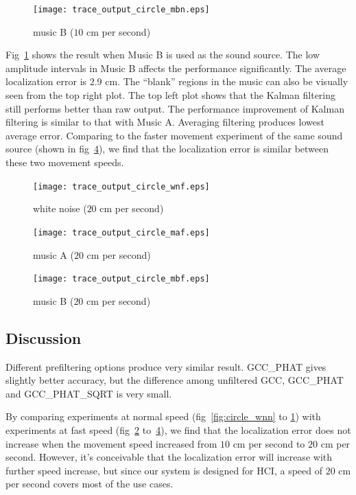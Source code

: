 \begin{figure}[h!]
\centering
\texttt{[image: trace\_output\_circle\_mbn.eps]}
\caption{music B ($10$ cm per second)}
\label{fig:circle_musicbn}
\end{figure}

Fig~\ref{fig:circle_musicbn} shows the result when Music B is used as the sound source.  The low amplitude intervals in Music B affects the performance significantly. The average localization error is $2.9$ cm. The ``blank'' regions in the music can also be visually seen from the top right plot. The top left plot shows that the Kalman filtering still performs better than raw output. The performance improvement of Kalman filtering is similar to that with Music A. Averaging filtering produces lowest average error. Comparing to the faster movement experiment of the same sound source (shown in fig~\ref{fig:circle_musicbf}), we find that the localization error is similar between these two movement speeds.

\begin{figure}[h!]
\centering
\texttt{[image: trace\_output\_circle\_wnf.eps]}
\caption{white noise ($20$ cm per second)}
\label{fig:circle_wnf}
\end{figure}

\begin{figure}[h!]
\centering
  \texttt{[image: trace\_output\_circle\_maf.eps]}
  \caption{music A ($20$ cm per second)}
  \label{fig:circle_musicaf}
\end{figure}

\begin{figure}[h!]
\centering
  \texttt{[image: trace\_output\_circle\_mbf.eps]}
  \caption{music B ($20$ cm per second)}
  \label{fig:circle_musicbf}
\end{figure}

\subsection{Discussion}

Different prefiltering options produce very similar result. GCC\_PHAT gives slightly better accuracy, but the difference among unfiltered GCC, GCC\_PHAT and GCC\_PHAT\_SQRT is very small. 

By comparing experiments at normal speed (fig~\ref{fig:circle_wnn} to \ref{fig:circle_musicbn}) with experiments at fast speed (fig~\ref{fig:circle_wnf} to~\ref{fig:circle_musicbf}), we find that the localization error does not increase when the movement speed increased from $10$ cm per second to $20$ cm per second. However, it's conceivable that the localization error will increase with further speed increase, but since our system is designed for HCI, a speed of $20$ cm per second covers most of the use cases. 


